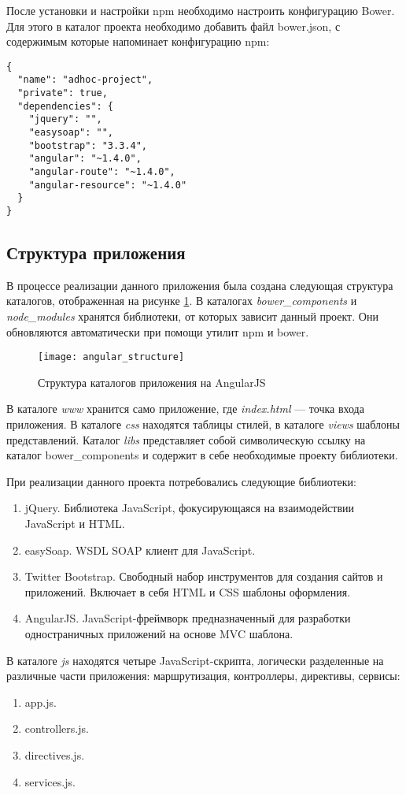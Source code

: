 После установки и настройки npm необходимо настроить конфигурацию Bower. Для этого в каталог проекта необходимо добавить файл bower.json, с содержимым которые напоминает конфигурацию npm:
\begin{lstlisting}
{
  "name": "adhoc-project",
  "private": true,
  "dependencies": {
    "jquery": "",
    "easysoap": "",
    "bootstrap": "3.3.4",
    "angular": "~1.4.0",
    "angular-route": "~1.4.0",
    "angular-resource": "~1.4.0"
  }
}
\end{lstlisting}

\subsection{Структура приложения}

В процессе реализации данного приложения была создана следующая структура каталогов, отображенная на рисунке \ref{angular_structure}. В каталогах \textit{bower\_components} и \textit{node\_modules} хранятся библиотеки, от которых зависит данный проект. Они обновляются автоматически при помощи утилит npm и bower.
\begin{figure}[h]
\center\texttt{[image: angular\_structure]}
\caption{Структура каталогов приложения на AngularJS}\label{angular_structure}
\end{figure}

В каталоге \textit{www} хранится само приложение, где \textit{index.html} --- точка входа приложения. В каталоге \textit{css} находятся таблицы стилей, в каталоге \textit{views} шаблоны представлений. Каталог \textit{libs} представляет собой символическую ссылку на каталог bower\_components и содержит в себе необходимые проекту библиотеки.

При реализации данного проекта потребовались следующие библиотеки:
\begin{enumerate}
 \item jQuery. Библиотека JavaScript, фокусирующаяся на взаимодействии JavaScript и HTML\cite{jquery}.
 \item easySoap. WSDL SOAP клиент для JavaScript.
 \item Twitter Bootstrap. Свободный набор инструментов для создания сайтов и приложений. Включает в себя HTML и CSS шаблоны оформления\cite{bootstrap}.
 \item AngularJS. JavaScript-фреймворк предназначенный для разработки одностраничных приложений на основе MVC шаблона\cite{angular}.
\end{enumerate}

В каталоге \textit{js} находятся четыре JavaScript-скрипта, логически разделенные на различные части приложения: маршрутизация, контроллеры, директивы, сервисы:
\begin{enumerate}
 \item app.js. 
 \item controllers.js.
 \item directives.js.
 \item services.js.
\end{enumerate}
